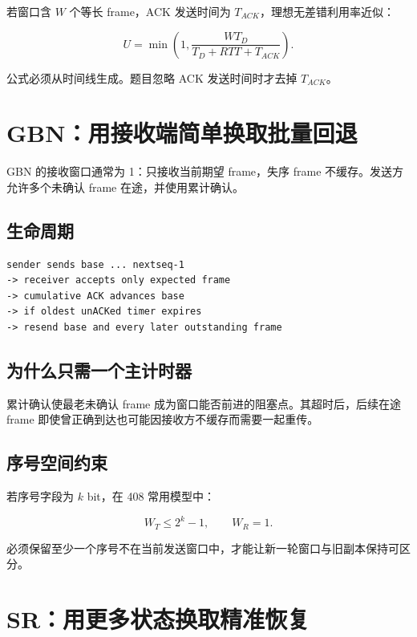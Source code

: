 \documentclass[UTF8,fontset=none,11pt,a4paper]{ctexart}
\begin{document}
若窗口含 \(W\) 个等长 frame，ACK 发送时间为
\(T_{ACK}\)，理想无差错利用率近似：

\[
U=\min\left(1,\frac{W T_D}{T_D+RTT+T_{ACK}}\right).
\]

公式必须从时间线生成。题目忽略 ACK 发送时间时才去掉 \(T_{ACK}\)。

\section{GBN：用接收端简单换取批量回退}\label{5-gbnux7528ux63a5ux6536ux7aefux7b80ux5355ux6362ux53d6ux6279ux91cfux56deux9000}

GBN 的接收窗口通常为 1：只接收当前期望 frame，失序 frame
不缓存。发送方允许多个未确认 frame 在途，并使用累计确认。

\subsection{生命周期}\label{51-ux751fux547dux5468ux671f}

\begin{lstlisting}
sender sends base ... nextseq-1
-> receiver accepts only expected frame
-> cumulative ACK advances base
-> if oldest unACKed timer expires
-> resend base and every later outstanding frame
\end{lstlisting}

\subsection{为什么只需一个主计时器}\label{52-ux4e3aux4ec0ux4e48ux53eaux9700ux4e00ux4e2aux4e3bux8ba1ux65f6ux5668}

累计确认使最老未确认 frame 成为窗口能否前进的阻塞点。其超时后，后续在途
frame 即使曾正确到达也可能因接收方不缓存而需要一起重传。

\subsection{序号空间约束}\label{53-ux5e8fux53f7ux7a7aux95f4ux7ea6ux675f}

若序号字段为 \(k\) bit，在 408 常用模型中：

\[
W_T\le 2^k-1,
\qquad W_R=1.
\]

必须保留至少一个序号不在当前发送窗口中，才能让新一轮窗口与旧副本保持可区分。

\section{SR：用更多状态换取精准恢复}\label{6-srux7528ux66f4ux591aux72b6ux6001ux6362ux53d6ux7cbeux51c6ux6062ux590d}
\end{document}
